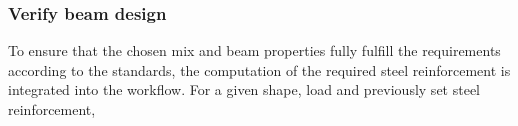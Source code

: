 \subsubsection{Verify beam design}


To ensure that the chosen mix and beam properties fully fulfill the requirements according to the standards, the computation of the required steel reinforcement is integrated into the workflow.
For a given shape, load and previously set steel reinforcement, 